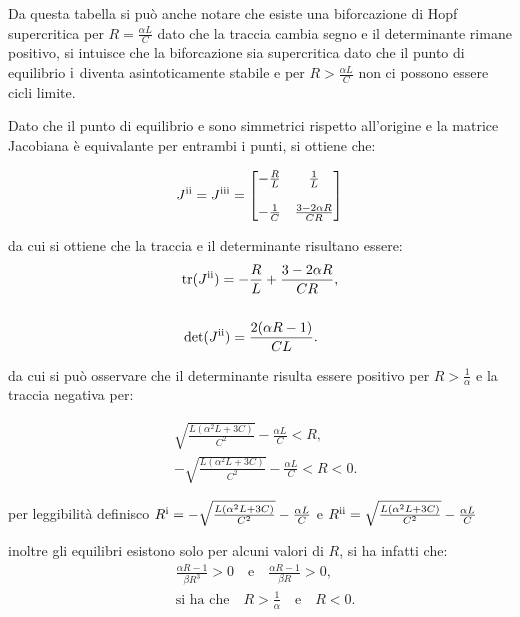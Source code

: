 \documentclass{article}
\newcommand{\rom}[1]{\uppercase\expandafter{\romannumeral #1\relax}}
\begin{document}
Da questa tabella si può anche notare che esiste una biforcazione di Hopf supercritica per \(R = \frac{\alpha L}{C}\) dato che la traccia cambia segno e il determinante rimane positivo, si intuisce che la biforcazione sia supercritica dato che il punto di equilibrio \(\text{\rom{1}}\) diventa asintoticamente stabile e per \(R > \frac{\alpha L}{C}\) non ci possono essere cicli limite.

Dato che il punto di equilibrio \rom{2} e \rom{3} sono simmetrici rispetto all'origine e la matrice Jacobiana è equivalante per entrambi i punti, si ottiene che:

\[
    J^\text{\rom{2}} = J^\text{\rom{3}} =
    \begin{bmatrix}
        -\frac{R}{L} & \frac{1}{L}               \\\\
        -\frac{1}{C} & \frac{3 - 2 \alpha R}{CR}
    \end{bmatrix}
\]

da cui si ottiene che la traccia e il determinante risultano essere:
\begin{align*}
     & \text{tr}(J^\text{\rom{2}}) = -\frac{R}{L} + \frac{3 - 2 \alpha R}{C R}, \\\\
     & \det(J^\text{\rom{2}})      = \frac{2(\alpha R - 1)}{CL}.
\end{align*}

da cui si può osservare che il determinante risulta essere positivo per \(R > \frac{1}{\alpha}\) e la traccia negativa per:

\begin{align*}
     & \sqrt{\frac{L(\alpha^2L + 3C)}{C^2}} - \frac{\alpha L}{C} < R,       \\
     & - \sqrt{\frac{L(\alpha^2L + 3C)}{C^2}} - \frac{\alpha L}{C} < R < 0.
\end{align*}

per leggibilità definisco \(R^\text{\rom{1}} = - \sqrt{\frac{L(\alpha^2L + 3C)}{C^2}} - \frac{\alpha L}{C}\) e \(R^\text{\rom{2}} = \sqrt{\frac{L(\alpha^2L + 3C)}{C^2}} - \frac{\alpha L}{C}\)

inoltre gli equilibri esistono solo per alcuni valori di \(R\), si ha infatti che:
\begin{align*}
     & \frac{\alpha R - 1}{\beta R^3} > 0 \hspace{1em} \text{e} \hspace{1em} \frac{\alpha R - 1}{\beta R} > 0, \\
     & \text{si ha che} \hspace{1em} R > \frac{1}{\alpha} \hspace{1em} \text{e} \hspace{1em} R < 0.
\end{align*}
\end{document}

